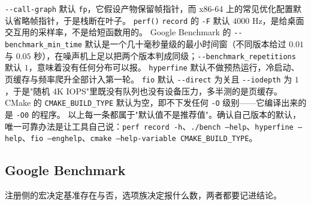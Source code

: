 \documentclass[12pt,a4paper,fontset=fandol]{ctexbook}
\newcommand{\Fn}[1]{\texttt{#1()}}
\newcommand{\Tp}[1]{\texttt{#1}}
\newcommand{\Opt}[1]{\texttt{-\/-#1}}
\begin{document}
\begin{warning}[title={六个默认值，六个方向不同的坑}]
\Opt{call-graph} 默认 \Tp{fp}，它假设产物保留帧指针，而 x86-64 上的常见优化配置默认省略帧指针，于是栈断在叶子。
\Fn{perf} \Tp{record} 的 \Tp{-F} 默认 $4000$ Hz，是给桌面交互用的采样率，不是给短函数用的。
Google Benchmark 的 \Opt{benchmark\_min\_time} 默认是一个几十毫秒量级的最小时间窗（不同版本给过 $0.01$ 与 $0.05$ 秒），在噪声机上足以把两个版本判成同级；\Opt{benchmark\_repetitions} 默认 $1$，意味着没有任何分布可以报。
\Tp{hyperfine} 默认不做预热运行，冷启动、页缓存与频率爬升全部计入第一轮。
\Tp{fio} 默认 \Opt{direct} 为关且 \Opt{iodepth} 为 $1$，于是"随机 4K IOPS"里既没有队列也没有设备压力，多半测的是页缓存。
CMake 的 \Tp{CMAKE\_BUILD\_TYPE} 默认为空，即不下发任何 \Tp{-O} 级别——它编译出来的是 \Tp{-O0} 的程序。
以上每一条都属于"默认值不是推荐值"。确认自己版本的默认，唯一可靠办法是让工具自己说：\Tp{perf record -h}、\Tp{./bench --help}、\Tp{hyperfine --help}、\Tp{fio --enghelp}、\Tp{cmake --help-variable CMAKE\_BUILD\_TYPE}。
\end{warning}

\subsection{Google Benchmark}
\label{sub:pmapB-gbench}

注册侧的宏决定基准存在与否，选项族决定报什么数，两者都要记进结论。
\end{document}
